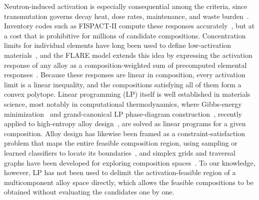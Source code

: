 Neutron-induced activation is especially consequential among the criteria, since
transmutation governs decay heat, dose rates, maintenance, and waste
burden~\cite{RAFMreview2017,gilbert2017waste}. Inventory codes such as FISPACT-II
compute these responses accurately~\cite{sublet2017fispact}, but at a cost that is
prohibitive for millions of candidate compositions. Concentration limits for
individual elements have long been used to define low-activation
materials~\cite{zucchetti1991impurity,cheng1998concentration}, and the FLARE model
extends this idea by expressing the activation response of any alloy as a
composition-weighted sum of precomputed elemental
responses~\cite{Marquez2026FLARE}. Because these responses are linear in
composition, every activation limit is a linear inequality, and the compositions
satisfying all of them form a convex polytope. Linear programming (LP) itself is well
established in materials science, most notably in computational thermodynamics,
where Gibbs-energy minimization~\cite{whitedantzig1958equilibrium} and grand-canonical
LP phase-diagram construction~\cite{akbarzadeh2007gclp}, recently applied to
high-entropy alloy design~\cite{sorkin2023lightweight}, are solved as linear
programs for a given composition. Alloy design has likewise been framed as a
constraint-satisfaction problem that maps the entire feasible composition region,
using sampling or learned classifiers to locate its
boundaries~\cite{arroyave2016inverse,galvan2017constraint,hardcastle2025gpc}, and
simplex grids and traversal graphs have been developed for exploring composition
spaces~\cite{nimplex}. To our knowledge, however, LP has not been used to delimit
the activation-feasible region of a multicomponent alloy space directly, which
allows the feasible compositions to be obtained without evaluating the candidates
one by one.

